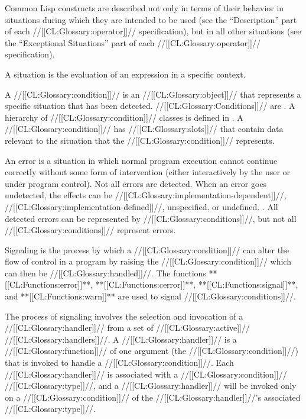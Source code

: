 





Common Lisp constructs are described not only in terms of their
behavior in situations during which they are intended to be used (see
the ``Description'' part of each //[[CL:Glossary:operator]]// specification),
but in all other situations (see the ``Exceptional Situations''
part of each //[[CL:Glossary:operator]]// specification).
 
A situation is the evaluation of an expression in a specific context.

A //[[CL:Glossary:condition]]// is an //[[CL:Glossary:object]]// that
represents a specific situation that has been detected.  
//[[CL:Glossary:Conditions]]// are .
A hierarchy of //[[CL:Glossary:condition]]// classes is defined in \clisp.  
A //[[CL:Glossary:condition]]// has //[[CL:Glossary:slots]]// that contain data 
relevant to the situation that the //[[CL:Glossary:condition]]// represents.

An error is a situation in which normal program execution cannot
continue correctly without some form of intervention (either
interactively by the user or under program control).  Not all errors
are detected.  When an error goes undetected, the effects can be
//[[CL:Glossary:implementation-dependent]]//, //[[CL:Glossary:implementation-defined]]//, unspecified, or
undefined. \Seesection\Definitions.  All detected errors can
be represented by //[[CL:Glossary:conditions]]//, but not all 
//[[CL:Glossary:conditions]]// represent errors.
 
Signaling is the process by which a //[[CL:Glossary:condition]]// can alter
the flow of control in a program by raising the 
//[[CL:Glossary:condition]]// which can then be //[[CL:Glossary:handled]]//.  The functions
**[[CL:Functions:error]]**, **[[CL:Functions:cerror]]**, **[[CL:Functions:signal]]**, and
**[[CL:Functions:warn]]** are used to signal //[[CL:Glossary:conditions]]//.
 
The process of signaling involves the selection and invocation of a
//[[CL:Glossary:handler]]// from a set of //[[CL:Glossary:active]]// //[[CL:Glossary:handlers]]//.  
A //[[CL:Glossary:handler]]// is a //[[CL:Glossary:function]]// of one argument (the 
//[[CL:Glossary:condition]]//) that is invoked to handle a //[[CL:Glossary:condition]]//.
Each //[[CL:Glossary:handler]]// is associated with a //[[CL:Glossary:condition]]// //[[CL:Glossary:type]]//,
and a //[[CL:Glossary:handler]]// will be invoked only on a //[[CL:Glossary:condition]]// of the
//[[CL:Glossary:handler]]//'s associated //[[CL:Glossary:type]]//.
 
